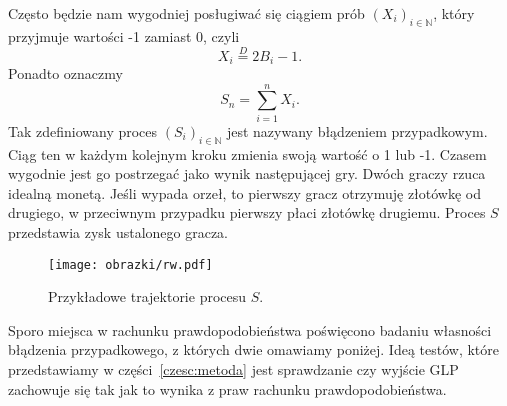 \documentclass[a4paper,11pt,oneside]{book}
\theoremstyle{definition}
\begin{document}
Często będzie nam wygodniej posługiwać się ciągiem prób $(X_i)_{i \in \mathbb{N}}$, który przyjmuje wartości -1 zamiast 0, czyli
\[ X_i \stackrel{D}{=} 2 B_i -1. \]
Ponadto oznaczmy
\[ S_n = \sum_{i=1}^{n} X_i. \]
Tak zdefiniowany proces $(S_i)_{i \in \mathbb{N}}$ jest nazywany błądzeniem przypadkowym. Ciąg ten w każdym kolejnym kroku zmienia swoją wartość o 1 lub -1. Czasem wygodnie jest go postrzegać jako wynik następującej gry. Dwóch graczy rzuca idealną monetą. Jeśli wypada orzeł, to pierwszy gracz otrzymuję złotówkę od drugiego, w przeciwnym przypadku pierwszy płaci złotówkę drugiemu. Proces $S$ przedstawia zysk ustalonego gracza.

\begin{figure}[ht]
 \centering
 \texttt{[image: obrazki/rw.pdf]}
 \caption{Przykładowe trajektorie procesu $S$.}
 \label{fig:bladzenie}
\end{figure}

Sporo miejsca w rachunku prawdopodobieństwa poświęcono badaniu własności błądzenia przypadkowego, z których dwie omawiamy poniżej. Ideą testów, które przedstawiamy w części~\ref{czesc:metoda} jest sprawdzanie czy wyjście GLP zachowuje się tak jak to wynika z praw rachunku prawdopodobieństwa.
\end{document}

